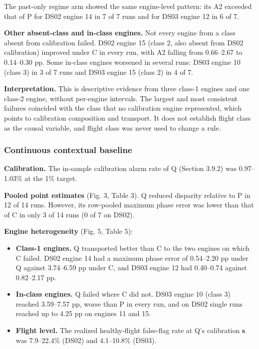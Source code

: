 \documentclass[preprint,11pt,a4paper]{elsarticle}
\begin{document}
The past-only regime arm showed the same engine-level pattern: its A2 exceeded that of P for DS02 engine 14 in 7 of 7 runs and for DS03 engine 12 in 6 of 7.

\textbf{Other absent-class and in-class engines.} Not every engine from a class absent from calibration failed. DS02 engine 15 (class 2, also absent from DS02 calibration) improved under C in every run, with A2 falling from 0.66–2.67 to 0.14–0.30 pp. Some in-class engines worsened in several runs: DS03 engine 10 (class 3) in 3 of 7 runs and DS03 engine 15 (class 2) in 4 of 7.

\textbf{Interpretation.} This is descriptive evidence from three class-1 engines and one class-2 engine, without per-engine intervals. The largest and most consistent failures coincided with the class that no calibration engine represented, which points to calibration composition and transport. It does not establish flight class as the causal variable, and flight class was never used to change a rule.

\subsubsection{Continuous contextual baseline}

\textbf{Calibration.} The in-sample calibration alarm rate of Q (Section 3.9.2) was 0.97–1.03\% at the 1\% target.

\textbf{Pooled point estimates} (Fig. 3, Table 3). Q reduced disparity relative to P in 12 of 14 runs. However, its row-pooled maximum phase error was lower than that of C in only 3 of 14 runs (0 of 7 on DS02).

\textbf{Engine heterogeneity} (Fig. 5, Table 5):
\begin{itemize}
\item \textbf{Class-1 engines.} Q transported better than C to the two engines on which C failed. DS02 engine 14 had a maximum phase error of 0.54–2.20 pp under Q against 3.74–6.59 pp under C, and DS03 engine 12 had 0.40–0.74 against 0.82–2.17 pp.
\item \textbf{In-class engines.} Q failed where C did not. DS03 engine 10 (class 3) reached 3.59–7.57 pp, worse than P in every run, and on DS02 single runs reached up to 4.25 pp on engines 11 and 15.
\item \textbf{Flight level.} The realized healthy-flight false-flag rate at Q's calibration κ was 7.9–22.4\% (DS02) and 4.1–10.8\% (DS03).
\end{itemize}
\end{document}
